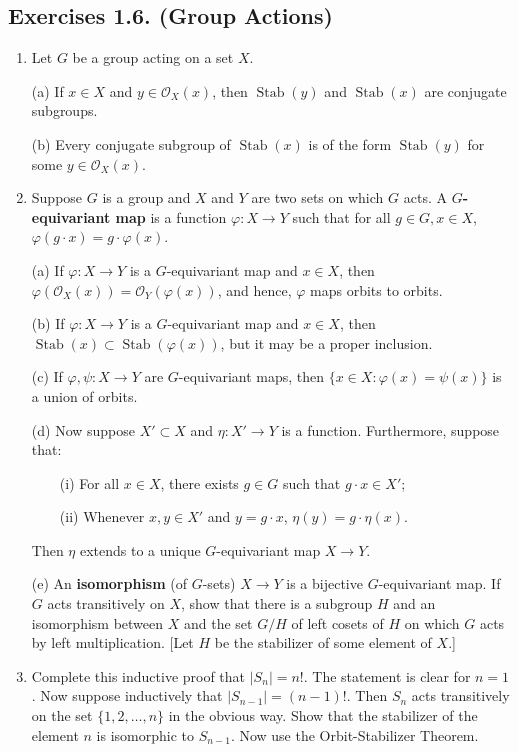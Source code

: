 \documentclass[leqno]{book}
\begin{document}
\subsection*{Exercises 1.6. (Group Actions)}
\begin{enumerate}
\item Let $G$ be a group acting on a set $X$.

(a) If $x\in X$ and $y\in\mathcal O_X(x)$, then $\operatorname{Stab}(y)$ and $\operatorname{Stab}(x)$ are conjugate subgroups.

(b) Every conjugate subgroup of $\operatorname{Stab}(x)$ is of the form $\operatorname{Stab}(y)$ for some $y\in\mathcal O_X(x)$.

\item Suppose $G$ is a group and $X$ and $Y$ are two sets on which $G$ acts.  A \textbf{$G$-equivariant map} is a function $\varphi:X\to Y$ such that for all $g\in G,x\in X$, $\varphi(g\cdot x)=g\cdot\varphi(x)$.

(a) If $\varphi:X\to Y$ is a $G$-equivariant map and $x\in X$, then $\varphi(\mathcal O_X(x))=\mathcal O_Y(\varphi(x))$, and hence, $\varphi$ maps orbits to orbits.

(b) If $\varphi:X\to Y$ is a $G$-equivariant map and $x\in X$, then $\operatorname{Stab}(x)\subset\operatorname{Stab}(\varphi(x))$, but it may be a proper inclusion.

(c) If $\varphi,\psi:X\to Y$ are $G$-equivariant maps, then $\{x\in X:\varphi(x)=\psi(x)\}$ is a union of orbits.

(d) Now suppose $X'\subset X$ and $\eta:X'\to Y$ is a function.  Furthermore, suppose that:

~~~~(i) For all $x\in X$, there exists $g\in G$ such that $g\cdot x\in X'$;

~~~~(ii) Whenever $x,y\in X'$ and $y=g\cdot x$, $\eta(y)=g\cdot\eta(x)$.

Then $\eta$ extends to a unique $G$-equivariant map $X\to Y$.

(e) An \textbf{isomorphism} (of $G$-sets) $X\to Y$ is a bijective $G$-equivariant map.  If $G$ acts transitively on $X$, show that there is a subgroup $H$ and an isomorphism between $X$ and the set $G/H$ of left cosets of $H$ on which $G$ acts by left multiplication.  [Let $H$ be the stabilizer of some element of $X$.]

\item Complete this inductive proof that $|S_n|=n!$.  The statement is clear for $n=1$.  Now suppose inductively that $|S_{n-1}|=(n-1)!$.  Then $S_n$ acts transitively on the set $\{1,2,\dots,n\}$ in the obvious way.  Show that the stabilizer of the element $n$ is isomorphic to $S_{n-1}$.  Now use the Orbit-Stabilizer Theorem.


\end{enumerate}
\end{document}

